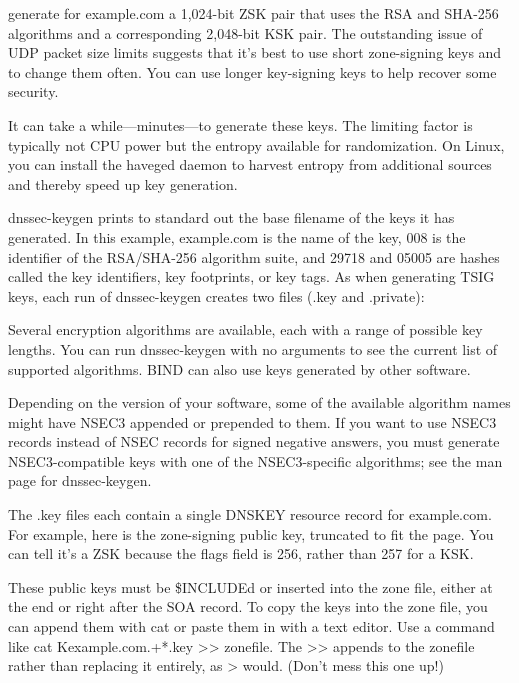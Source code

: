 \protect\hypertarget{part0024_split_063.htmlux5cux23_idIndexMarker2262}{}{}\protect\hypertarget{part0024_split_063.htmlux5cux23_idIndexMarker2263}{}{}generate
for example.com a 1,024-bit ZSK pair that uses the RSA and SHA-256
algorithms and a corresponding 2,048-bit KSK pair. The outstanding issue
of UDP packet size limits suggests that it's best to use short
zone-signing keys and to change them often. You can use longer
key-signing keys to help recover some security.

It can take a while---minutes---to generate these keys. The limiting
factor is typically not CPU power but the entropy available for
randomization. On Linux, you can install the {haveged} daemon to harvest
entropy from additional sources and thereby speed up key generation.

{dnssec-keygen} prints to standard out the base filename of the keys it
has generated. In this example, {example.com} is the name of the key,
{008} is the identifier of the RSA/SHA-256 algorithm suite, and {29718}
and {05005} are hashes called the key identifiers, key footprints, or
key tags. As when generating TSIG keys, each run of {dnssec-keygen}
creates two files ({.key} and {.private}):


Several{ }encryption{ }algorithms{ }are{ }available, each with a range
of possible key lengths. You can run {dnssec-keygen} with no arguments
to see the current list of supported algorithms. BIND can also use keys
generated by other software.

Depending on the version of your software, some of the available
algorithm names might have NSEC3 appended or prepended to them. If you
want to use NSEC3 records instead of NSEC records for signed negative
answers, you must generate NSEC3-compatible keys with one of the
NSEC3-specific algorithms; see the man page for {dnssec-keygen}.

The {.key} files each contain a single DNSKEY resource record for
example.com. For example, here is the zone-signing public key, truncated
to fit the page. You can tell it's a ZSK because the flags field is 256,
rather than 257 for a KSK.


These public keys must be {\$INCLUDE}d or inserted into the zone file,
either at the end or right after the SOA record. To copy the keys into
the zone file, you can append them with {cat }or paste them in with a
text editor. Use a command like {cat Kexample.com.+*.key
\textgreater\textgreater{} zonefile}. The {\textgreater\textgreater{}}
appends to the {zonefile} rather than replacing it entirely, as
{\textgreater{}} would. (Don't mess this one up!)

